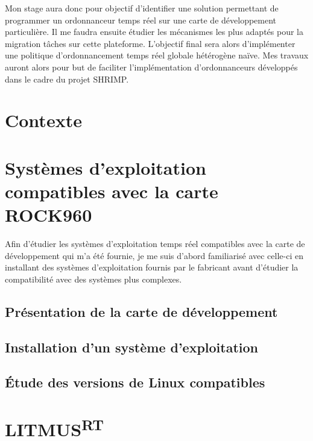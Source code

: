 \documentclass{article}
\newcommand{\litmus}{LITMUS\textsuperscript{RT}}
\begin{document}
    Mon stage aura donc pour objectif d'identifier une solution permettant de programmer un \gls{ordonnanceur} temps réel sur une carte de développement particulière. Il me faudra ensuite étudier les mécanismes les plus adaptés pour la migration tâches sur cette plateforme. L'objectif final sera alors d'implémenter une politique d'\gls{ordonnancement} temps réel globale hétérogène naïve. Mes travaux auront alors pour but de faciliter l'implémentation d'ordonnanceurs développés dans le cadre du projet SHRIMP.
    
    \newpage
    \section{Contexte}
    
    


    \newpage
    
    \section[OS compatibles avec la carte]{Systèmes d'exploitation compatibles avec la carte ROCK960}

    Afin d'étudier les systèmes d'exploitation temps réel compatibles avec la carte de développement qui m'a été fournie, je me suis d'abord familiarisé avec celle-ci en installant des systèmes d'exploitation fournis par le fabricant avant d'étudier la compatibilité avec des systèmes plus complexes.

    
    \subsection{Présentation de la carte de développement}
    

    \subsection{Installation d'un système d'exploitation}
    

    \subsection{Étude des versions de Linux compatibles}
    

    \newpage
    \section{\litmus}
    \label{section:litmus}
    
\end{document}
